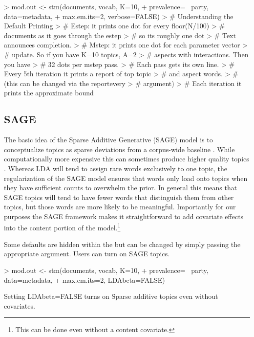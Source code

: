 \documentclass[nojss]{jss}
\begin{document}
\begin{Schunk}
\begin{Sinput}
> mod.out <- stm(documents, vocab, K=10,
+                prevalence= ~party, data=metadata,
+                max.em.its=2, verbose=FALSE)
> # Understanding the Default Printing
> #   Estep: it prints one dot for every floor(N/100)
> #          documents as it goes through the estep
> #          so its roughly one dot %
> #          Text announces completion.
> #   Mstep: it prints one dot for each parameter vector
> #          update. So if you have K=10 topics, A=2
> #          aspects with interactions.  Then you have
> #          32 dots per mstep pass.
> #         Each pass gets its own line.
> #   Every 5th iteration it prints a report of top topic
> #          and aspect words.
> #          (this can be changed via the reportevery
> #          argument)
> #   Each iteration it prints the approximate bound
\end{Sinput}
\end{Schunk}




\subsection{SAGE}
The basic idea of the Sparse Additive Generative (SAGE) model is to conceptualize topics as sparse deviations from a corpus-wide baseline \citep{eisenstein2011sparse}.  While computationally more expensive this can sometimes produce higher quality topics .  Whereas LDA will tend to assign rare words exclusively to one topic, the regularization of the SAGE model ensures that words only load onto topics when they have sufficient counts to overwhelm the prior.  In general this means that SAGE topics will tend to have fewer words that distinguish them from other topics, but those words are more likely to be meaningful.  Importantly for our purposes the SAGE framework makes it straightforward to add covariate effects into the content portion of the model.\footnote{This can be done even without a content covariate.}

Some defaults are hidden within the  but can be changed by simply passing the appropriate argument. Users can turn on SAGE topics.
\begin{Schunk}
\begin{Sinput}
> mod.out <- stm(documents, vocab, K=10,
+                prevalence= ~party, data=metadata,
+                max.em.its=2, LDAbeta=FALSE)
\end{Sinput}
\end{Schunk}
Setting LDAbeta=FALSE turns on Sparse additive topics even without covariates.
\end{document}

